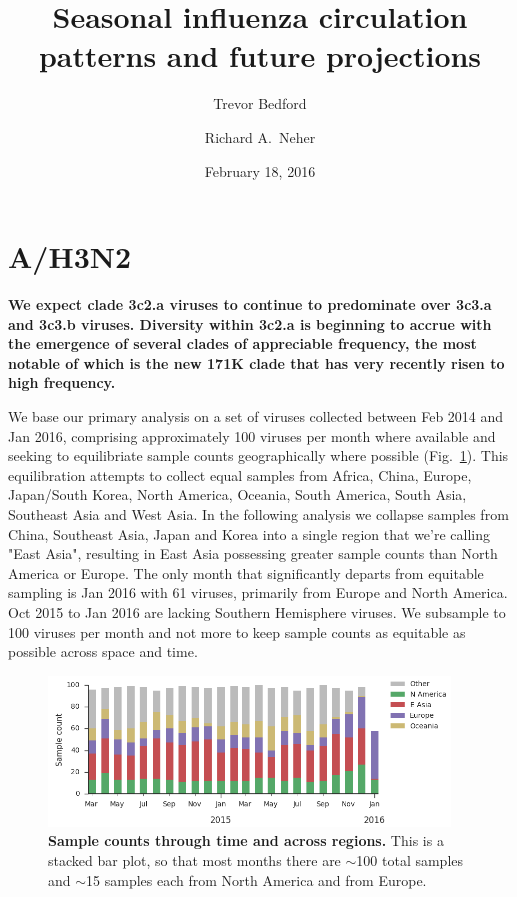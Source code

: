 \documentclass[11pt,oneside,letterpaper]{article}
\title{\vspace{2cm} \Large \bf 
Seasonal influenza circulation patterns and future projections
}
\author[1]{Trevor Bedford}
\author[2]{Richard A.\ Neher}
\affil[1]{Vaccine and Infectious Disease Division, Fred Hutchinson Cancer Research Center, Seattle, WA, USA.}
\affil[2]{Max Planck Institute for Developmental Biology, T\"ubingen, Germany.}
\date{February 18, 2016}
\begin{document}
\maketitle

\tableofcontents

\pagebreak

\section*{A/H3N2}

\textbf{We expect clade 3c2.a viruses to continue to predominate over 3c3.a and 3c3.b viruses. Diversity within 3c2.a is beginning to accrue with the emergence of several clades of appreciable frequency, the most notable of which is the new 171K clade that has very recently risen to high frequency.}

We base our primary analysis on a set of viruses collected between Feb 2014 and Jan 2016, comprising approximately 100 viruses per month where available and seeking to equilibriate sample counts geographically where possible (Fig.\ \ref{H3N2_counts}). This equilibration attempts to collect equal samples from Africa, China, Europe, Japan/South Korea, North America, Oceania, South America, South Asia, Southeast Asia and West Asia. In the following analysis we collapse samples from China, Southeast Asia, Japan and Korea into a single region that we're calling "East Asia", resulting in East Asia possessing greater sample counts than North America or Europe. The only month that significantly departs from equitable sampling is Jan 2016 with 61 viruses, primarily from Europe and North America. Oct 2015 to Jan 2016 are lacking Southern Hemisphere viruses. We subsample to 100 viruses per month and not more to keep sample counts as equitable as possible across space and time.

\begin{figure}[H]
	\centering		
	\includegraphics[width=0.95\textwidth]{../figures/feb-2016/H3N2_counts.png}
	\caption{\textbf{Sample counts through time and across regions.}
	This is a stacked bar plot, so that most months there are $\sim$100 total samples and $\sim$15 samples each from North America and from Europe.
	}
	\label{H3N2_counts}
\end{figure}
\end{document}
